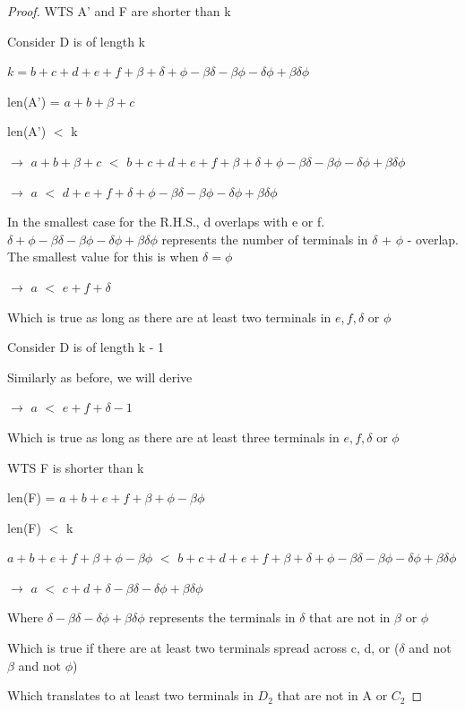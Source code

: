 \documentclass[manuscript]{acmart}
\begin{document}
\begin{proof}
        WTS A' and F are shorter than k

        Consider D is of length k

        $k = b + c + d + e + f + \beta + \delta + \phi - \beta \delta 
        - \beta \phi - \delta \phi + \beta \delta \phi$

        len(A') = $a + b + \beta + c$

        len(A') $<$ k

        $\rightarrow$ $a + b + \beta + c$ $<$ $b + c + d + e + f + \beta + \delta + \phi - \beta \delta 
        - \beta \phi - \delta \phi + \beta \delta \phi$

        $\rightarrow$ $a$ $<$ $d + e + f + \delta + \phi - \beta \delta 
        - \beta \phi - \delta \phi + \beta \delta \phi$

        In the smallest case for the R.H.S., d overlaps with e or f. 
        $\delta + \phi - \beta \delta - \beta \phi - \delta \phi + \beta \delta \phi$
        represents the number of terminals in $\delta$ + $\phi$ - overlap.
        The smallest value for this is when $\delta = \phi$

        $\rightarrow$ $a$ $<$ $e + f + \delta$

        Which is true as long as there are at least two terminals in $e, f, \delta$ or $\phi$

        Consider D is of length k - 1

        Similarly as before, we will derive

        $\rightarrow$ $a$ $<$ $e + f + \delta - 1$

        Which is true as long as there are at least three terminals in $e, f, \delta$ or $\phi$

        WTS F is shorter than k

        len(F) = $a + b + e + f + \beta + \phi - \beta \phi$

        len(F) $<$ k

        $a + b + e + f + \beta + \phi - \beta \phi$ $< $ $b + c + d + e + f + \beta + \delta + \phi - \beta \delta 
        - \beta \phi - \delta \phi + \beta \delta \phi$

        $\rightarrow$ $a$ $< $ $c + d + \delta - \beta \delta - \delta \phi + \beta \delta \phi$

        Where $\delta - \beta \delta - \delta \phi + \beta \delta \phi$ represents
        the terminals in $\delta$ that are not in $\beta$ or $\phi$

        Which is true if there are at least two terminals spread across c, d, or ($\delta$ and not $\beta$ and not $\phi$)

        Which translates to at least two terminals in $D_2$ that are not in A or $C_2$

    \end{proof}
\end{document}
